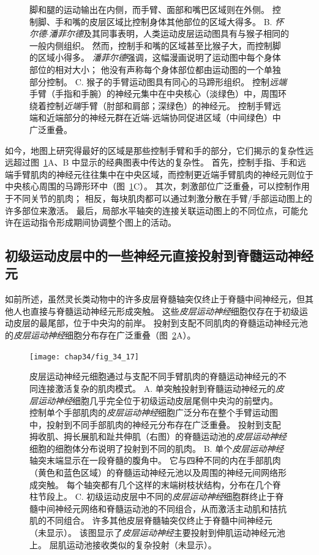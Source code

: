 \begin{figure}[htbp]
{		脚和腿的运动输出在内侧，而手臂、面部和嘴巴区域则在外侧。
		控制脚、手和嘴的皮层区域比控制身体其他部位的区域大得多。
		B. \textit{怀尔德$\cdot$潘菲尔德}及其同事表明，人类运动皮层运动图具有与猴子相同的一般内侧组织。
		然而，控制手和嘴的区域甚至比猴子大，而控制脚的区域小得多。
		\textit{潘菲尔德}强调，这幅漫画说明了运动图中每个身体部位的相对大小；
		他没有声称每个身体部位都由运动图的一个单独部分控制。
		C. 猴子的手臂运动图具有同心的马蹄形组织。
		控制\textit{远端}手臂（手指和手腕）的神经元集中在中央核心（淡绿色）中，周围环绕着控制\textit{近端}手臂（肘部和肩部；深绿色）的神经元。
		控制手臂远端和近端部分的神经元群在近端-远端协同促进区域（中间绿色）中广泛重叠\cite{park2001consistent}。}
	\label{fig:34_16}
\end{figure}


如今，地图上研究得最好的区域是那些控制手臂和手的部分，它们揭示的复杂性远远超过图~\ref{fig:34_16}A、B 中显示的经典图表中传达的复杂性。
首先，控制手指、手和远端手臂肌肉的神经元往往集中在中央区域，而控制更近端手臂肌肉的神经元则位于中央核心周围的马蹄形环中（图~\ref{fig:34_16}C）。
其次，刺激部位广泛重叠，可以控制作用于不同关节的肌肉；
相反，每块肌肉都可以通过刺激分散在手臂/手部运动图上的许多部位来激活。
最后，局部水平轴突的连接关联运动图上的不同位点，可能允许在运动指令形成期间协调整个图上的活动。



\subsection{初级运动皮层中的一些神经元直接投射到脊髓运动神经元}

如前所述，虽然灵长类动物中的许多皮层脊髓轴突仅终止于脊髓中间神经元，但其他人也直接与脊髓运动神经元形成突触。
这些\textit{皮层运动神经}细胞仅存在于初级运动皮层的最尾部，位于中央沟的前岸。
投射到支配不同肌肉的脊髓运动神经元池的\textit{皮层运动神经}细胞分布存在广泛重叠（图~\ref{fig:34_17}A）。


\begin{figure}[htbp]
	\centering
	\texttt{[image: chap34/fig\_34\_17]}
	\caption{皮层运动神经元细胞通过与支配不同手臂肌肉的脊髓运动神经元的不同连接激活复杂的肌肉模式。
		A. 单突触投射到脊髓运动神经元的\textit{皮层运动神经}细胞几乎完全位于初级运动皮层尾侧中央沟的前壁内。
		控制单个手部肌肉的\textit{皮层运动神经}细胞广泛分布在整个手臂运动图中，投射到不同手部肌肉的神经元分布存在广泛重叠。
		投射到支配拇收肌、拇长展肌和趾共伸肌（右图）的脊髓运动池的\textit{皮层运动神经}细胞的细胞体分布说明了投射到不同的肌肉\cite{rathelot2006muscle}。
		B. 单个\textit{皮层运动神经}轴突末端显示在一段脊髓的腹角中。
		它与四种不同的内在手部肌肉（黄色和蓝色区域）的脊髓运动神经元池以及周围的神经元间网络形成突触。
		每个轴突都有几个这样的末端树枝状结构，分布在几个脊柱节段上\cite{shinoda1981divergent}。
		C. 初级运动皮层中不同的\textit{皮层运动神经}细胞群终止于脊髓中间神经元网络和脊髓运动池的不同组合，从而激活主动肌和拮抗肌的不同组合。
		许多其他皮层脊髓轴突仅终止于脊髓中间神经元（未显示）。
		该图显示了\textit{皮层运动神经}主要投射到伸肌运动神经元池上。
		屈肌运动池接收类似的复杂投射（未显示）\cite{cheney1985patterns}。}
	\label{fig:34_17}
\end{figure}


